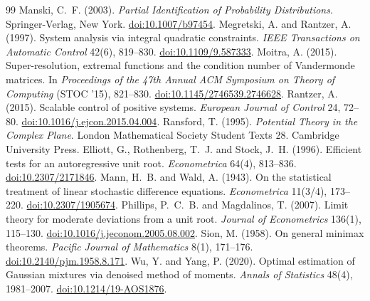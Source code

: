 \begin{thebibliography}{99}
 Manski, C.~F. (2003). \emph{Partial Identification of Probability Distributions}. Springer-Verlag, New York. \href{https://doi.org/10.1007/b97454}{doi:10.1007/b97454}.
 Megretski, A. and Rantzer, A. (1997). System analysis via integral quadratic constraints. \emph{IEEE Transactions on Automatic Control} 42(6), 819--830. \href{https://doi.org/10.1109/9.587333}{doi:10.1109/9.587333}.
 Moitra, A. (2015). Super-resolution, extremal functions and the condition number of Vandermonde matrices. In \emph{Proceedings of the 47th Annual ACM Symposium on Theory of Computing} (STOC '15), 821--830. \href{https://doi.org/10.1145/2746539.2746628}{doi:10.1145/2746539.2746628}.
 Rantzer, A. (2015). Scalable control of positive systems. \emph{European Journal of Control} 24, 72--80. \href{https://doi.org/10.1016/j.ejcon.2015.04.004}{doi:10.1016/j.ejcon.2015.04.004}.
 Ransford, T. (1995). \emph{Potential Theory in the Complex Plane}. London Mathematical Society Student Texts 28. Cambridge University Press.
 Elliott, G., Rothenberg, T.~J. and Stock, J.~H. (1996). Efficient tests for an autoregressive unit root. \emph{Econometrica} 64(4), 813--836. \href{https://doi.org/10.2307/2171846}{doi:10.2307/2171846}.
 Mann, H.~B. and Wald, A. (1943). On the statistical treatment of linear stochastic difference equations. \emph{Econometrica} 11(3/4), 173--220. \href{https://doi.org/10.2307/1905674}{doi:10.2307/1905674}.
 Phillips, P.~C.~B. and Magdalinos, T. (2007). Limit theory for moderate deviations from a unit root. \emph{Journal of Econometrics} 136(1), 115--130. \href{https://doi.org/10.1016/j.jeconom.2005.08.002}{doi:10.1016/j.jeconom.2005.08.002}.
 Sion, M. (1958). On general minimax theorems. \emph{Pacific Journal of Mathematics} 8(1), 171--176. \href{https://doi.org/10.2140/pjm.1958.8.171}{doi:10.2140/pjm.1958.8.171}.
 Wu, Y. and Yang, P. (2020). Optimal estimation of Gaussian mixtures via denoised method of moments. \emph{Annals of Statistics} 48(4), 1981--2007. \href{https://doi.org/10.1214/19-AOS1876}{doi:10.1214/19-AOS1876}.
\end{thebibliography}

